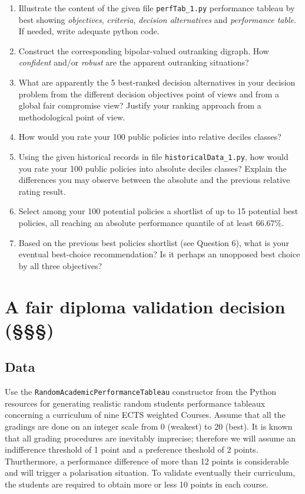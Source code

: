 \begin{enumerate}
\item Illustrate the content of the given file \texttt{perfTab\_1.py} performance tableau by best showing \emph{objectives}, \emph{criteria}, \emph{decision alternatives} and \emph{performance table}. If needed, write adequate python code.
\item Construct the corresponding bipolar-valued outranking digraph. How \emph{confident} and/or \emph{robust} are the apparent outranking situations?
\item What are apparently the 5 best-ranked decision alternatives in your decision problem from the different decision objectives point of views and from a global fair compromise view? Justify your ranking approach from a methodological point of view.
\item How would you rate your 100 public policies into relative deciles classes?
\item Using the given historical records in file \texttt{historicalData\_1.py}, how would you rate your 100 public policies into absolute deciles classes? Explain the differences you may observe between the absolute and the previous relative rating result.
\item  Select among your 100 potential policies a shortlist of up to 15 potential best policies,  all reaching an absolute performance quantile of at least $66.67\%$.
\item Based on the previous best policies shortlist (see Question 6), what is your eventual best-choice recommendation? Is it perhaps an unopposed best choice by all three objectives?
\end{enumerate}

\section{A fair diploma validation decision (§§§)}
\label{sec:15.5}

\subsection{Data}
\label{sec:15.5.1}

Use the \texttt{RandomAcademicPerformanceTableau} constructor from the \Digraph Python resources for generating realistic random students performance tableaux concerning a curriculum of nine ECTS weighted Courses. Assume that all the gradings are done on an integer scale from 0 (weakest) to 20 (best). It is known that all grading procedures are inevitably imprecise; therefore we will assume an indifference threshold of 1 point and a preference theshold of 2 points. Thurthermore, a performance difference of more than 12 points is considerable and will trigger a polarisation situation. To validate eventually their curriculum, the students are required to obtain more or less 10 points in each course. 

